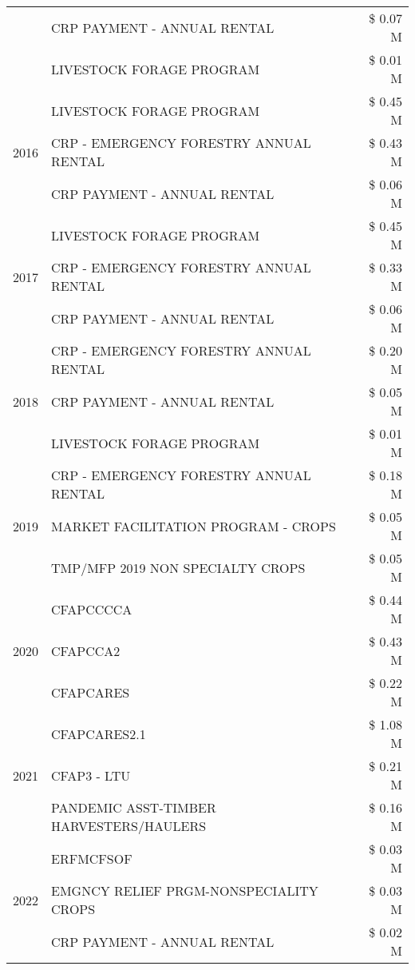 \begin{tabular}{llr}
 & CRP PAYMENT - ANNUAL RENTAL & \$ 0.07 M \\
 & LIVESTOCK FORAGE PROGRAM & \$ 0.01 M \\
\cline{1-3}
\multirow[t]{3}{*}{2016} & LIVESTOCK FORAGE PROGRAM & \$ 0.45 M \\
 & CRP - EMERGENCY FORESTRY ANNUAL RENTAL & \$ 0.43 M \\
 & CRP PAYMENT - ANNUAL RENTAL & \$ 0.06 M \\
\cline{1-3}
\multirow[t]{3}{*}{2017} & LIVESTOCK FORAGE PROGRAM & \$ 0.45 M \\
 & CRP - EMERGENCY FORESTRY ANNUAL RENTAL & \$ 0.33 M \\
 & CRP PAYMENT - ANNUAL RENTAL & \$ 0.06 M \\
\cline{1-3}
\multirow[t]{3}{*}{2018} & CRP - EMERGENCY FORESTRY ANNUAL RENTAL & \$ 0.20 M \\
 & CRP PAYMENT - ANNUAL RENTAL & \$ 0.05 M \\
 & LIVESTOCK FORAGE PROGRAM & \$ 0.01 M \\
\cline{1-3}
\multirow[t]{3}{*}{2019} & CRP - EMERGENCY FORESTRY ANNUAL RENTAL & \$ 0.18 M \\
 & MARKET FACILITATION PROGRAM - CROPS & \$ 0.05 M \\
 & TMP/MFP 2019 NON SPECIALTY CROPS & \$ 0.05 M \\
\cline{1-3}
\multirow[t]{3}{*}{2020} & CFAPCCCCA & \$ 0.44 M \\
 & CFAPCCA2 & \$ 0.43 M \\
 & CFAPCARES & \$ 0.22 M \\
\cline{1-3}
\multirow[t]{3}{*}{2021} & CFAPCARES2.1 & \$ 1.08 M \\
 & CFAP3 - LTU & \$ 0.21 M \\
 & PANDEMIC ASST-TIMBER HARVESTERS/HAULERS & \$ 0.16 M \\
\cline{1-3}
\multirow[t]{3}{*}{2022} & ERFMCFSOF & \$ 0.03 M \\
 & EMGNCY RELIEF PRGM-NONSPECIALITY CROPS & \$ 0.03 M \\
 & CRP PAYMENT - ANNUAL RENTAL & \$ 0.02 M \\
\cline{1-3}
\bottomrule
\end{tabular}

